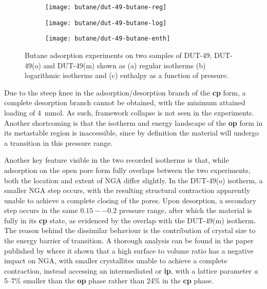 \begin{figure}[htb]
    \centering
    \begin{subfigure}{0.33\linewidth}
        \texttt{[image: butane/dut-49-butane-reg]}%
        \caption{}\label{dut:fgr:dut-49-butane-reg}
    \end{subfigure}%
    \begin{subfigure}{0.33\linewidth}
        \texttt{[image: butane/dut-49-butane-log]}%
        \caption{}\label{dut:fgr:dut-49-butane-log}
    \end{subfigure}%
    \begin{subfigure}{0.33\linewidth}
        \texttt{[image: butane/dut-49-butane-enth]}%
        \caption{}\label{dut:fgr:dut-49-butane-enth}
    \end{subfigure}%
    \caption{Butane adsorption experiments on two samples of 
    DUT-49, DUT-49(o) and DUT-49(m) shown as (a) regular 
    isotherms (b) logarithmic isotherms 
    and (c) enthalpy as a function of pressure.}%
    \label{dut:fgr:dut-49-butane}
\end{figure}

Due to the steep knee in the adsorption/desorption branch of the 
\textbf{cp} form, a complete desorption branch cannot be obtained,
with the minimum attained loading of \SI{4}{\milli\mol}. As such,
framework collapse is not seen in the experiments. Another 
shortcoming is that the isotherm
and energy landscape of the \textbf{op} form in its metastable 
region is inaccessible, since by definition the material will 
undergo a transition in this pressure range.

Another key feature visible in the two recorded isotherms is that,
while adsorption on the open pore form fully overlaps between the 
two experiments, both the location and extent of NGA differ 
slightly. In the DUT-49(o) isotherm, a smaller NGA step occurs,
with the resulting structural contraction apparently unable to 
achieve a complete closing of the pores. Upon desorption, a 
secondary step occurs in the same \(0.15--0.2\) pressure range,
after which the material is fully in its \textbf{cp} state,
as evidenced by the overlap with the DUT-49(m) isotherm. The 
reason behind the dissimilar behaviour is the contribution
of crystal size to the energy barrier of transition. A thorough
analysis can be found in the paper published 
by \citet{krauseEffectCrystalliteSize2018} where it shown that 
a high surface to volume ratio has a negative impact on NGA, with 
smaller crystallites unable to achieve a complete contraction,
instead accessing an intermediated or \textbf{ip}, with a lattice
parameter \textit{a} 5--7\% smaller than the \textbf{op} phase
rather than 24\% in the \textbf{cp} phase.

